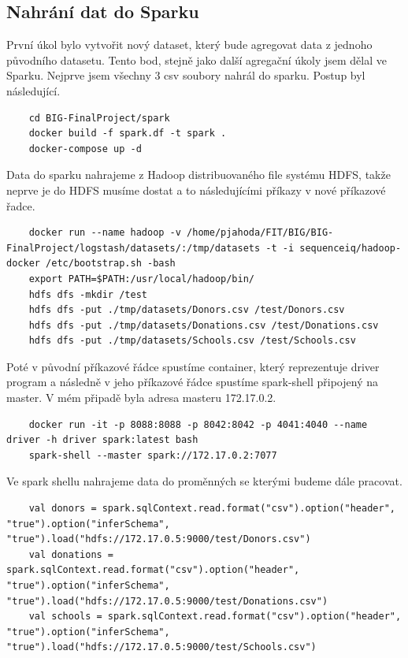 \documentclass[12pt,a4paper]{article}
\begin{document}
\subsection{Nahrání dat do Sparku}
První úkol bylo vytvořit nový dataset, který bude agregovat data z jednoho původního datasetu. Tento bod, stejně jako další agregační úkoly jsem dělal ve Sparku. Nejprve jsem všechny 3 csv soubory nahrál do sparku. Postup byl následující.
\begin{lstlisting}
    cd BIG-FinalProject/spark
    docker build -f spark.df -t spark .
    docker-compose up -d
\end{lstlisting}

Data do sparku nahrajeme z Hadoop distribuovaného file systému HDFS, takže neprve je do HDFS musíme dostat a to následujícími příkazy v nové příkazové řadce.
\begin{lstlisting}
    docker run --name hadoop -v /home/pjahoda/FIT/BIG/BIG-FinalProject/logstash/datasets/:/tmp/datasets -t -i sequenceiq/hadoop-docker /etc/bootstrap.sh -bash
    export PATH=$PATH:/usr/local/hadoop/bin/
    hdfs dfs -mkdir /test
    hdfs dfs -put ./tmp/datasets/Donors.csv /test/Donors.csv
    hdfs dfs -put ./tmp/datasets/Donations.csv /test/Donations.csv
    hdfs dfs -put ./tmp/datasets/Schools.csv /test/Schools.csv
\end{lstlisting}

Poté v původní příkazové řádce spustíme container, který reprezentuje driver program a následně v jeho příkazové řádce spustíme spark-shell připojený na master. V mém připadě byla adresa masteru 172.17.0.2.
\begin{lstlisting}
    docker run -it -p 8088:8088 -p 8042:8042 -p 4041:4040 --name driver -h driver spark:latest bash
    spark-shell --master spark://172.17.0.2:7077
\end{lstlisting}

Ve spark shellu nahrajeme data do proměnných se kterými budeme dále pracovat.
\begin{lstlisting}
    val donors = spark.sqlContext.read.format("csv").option("header", "true").option("inferSchema", "true").load("hdfs://172.17.0.5:9000/test/Donors.csv")
    val donations = spark.sqlContext.read.format("csv").option("header", "true").option("inferSchema", "true").load("hdfs://172.17.0.5:9000/test/Donations.csv")
    val schools = spark.sqlContext.read.format("csv").option("header", "true").option("inferSchema", "true").load("hdfs://172.17.0.5:9000/test/Schools.csv")
\end{lstlisting}
\end{document}
